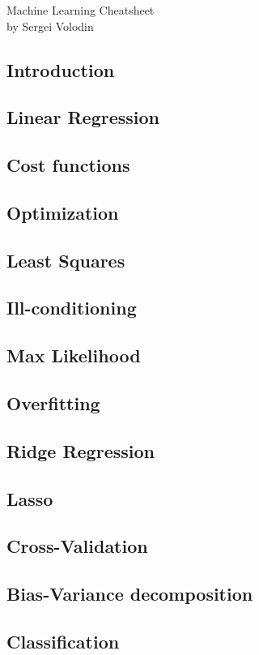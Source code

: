 \documentclass[twocolumn]{article}
\begin{document}
\begin{center}
	{\large Machine Learning Cheatsheet}\\
	by Sergei Volodin
\end{center}
\subsection*{Introduction}
\subsection*{Linear Regression}
\subsection*{Cost functions}
\subsection*{Optimization}
\subsection*{Least Squares}
\subsection*{Ill-conditioning}
\subsection*{Max Likelihood}
\subsection*{Overfitting}
\subsection*{Ridge Regression}
\subsection*{Lasso}
\subsection*{Cross-Validation}
\subsection*{Bias-Variance decomposition}
\subsection*{Classification}
\end{document}
